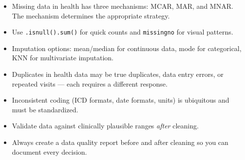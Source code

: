 \begin{itemize}
  \item Missing data in health has three mechanisms: MCAR, MAR, and MNAR. The mechanism determines the appropriate strategy.
  \item Use \texttt{.isnull().sum()} for quick counts and \texttt{missingno} for visual patterns.
  \item Imputation options: mean/median for continuous data, mode for categorical, KNN for multivariate imputation.
  \item Duplicates in health data may be true duplicates, data entry errors, or repeated visits --- each requires a different response.
  \item Inconsistent coding (ICD formats, date formats, units) is ubiquitous and must be standardized.
  \item Validate data against clinically plausible ranges \emph{after} cleaning.
  \item Always create a data quality report before and after cleaning so you can document every decision.
\end{itemize}
